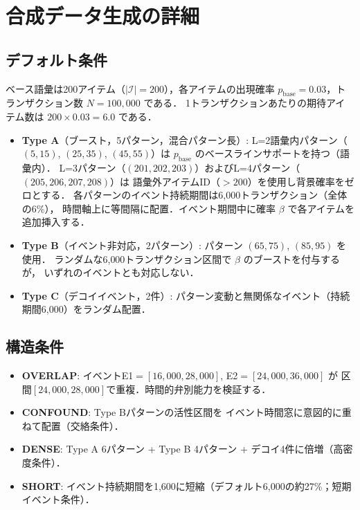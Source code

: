 \section{合成データ生成の詳細}\label{app:synthetic}

\subsection{デフォルト条件}

ベース語彙は200アイテム（$|\mathcal{I}| = 200$），各アイテムの出現確率
$p_{\text{base}} = 0.03$，トランザクション数 $N = 100{,}000$ である．
1トランザクションあたりの期待アイテム数は $200 \times 0.03 = 6.0$ である．

\begin{itemize}
\item \textbf{Type A}（ブースト，5パターン，混合パターン長）:
    L=2語彙内パターン（$(5,15)$, $(25,35)$, $(45,55)$）は
    $p_{\text{base}}$ のベースラインサポートを持つ（語彙内）．
    L=3パターン（$(201,202,203)$）およびL=4パターン（$(205,206,207,208)$）は
    語彙外アイテムID（$>200$）を使用し背景確率をゼロとする．
    各パターンのイベント持続期間は6{,}000トランザクション（全体の6\%），
    時間軸上に等間隔に配置．イベント期間中に確率 $\beta$ で各アイテムを追加挿入する．
\item \textbf{Type B}（イベント非対応，2パターン）:
    パターン $(65,75)$, $(85,95)$ を使用．
    ランダムな6{,}000トランザクション区間で $\beta$ のブーストを付与するが，
    いずれのイベントとも対応しない．
\item \textbf{Type C}（デコイイベント，2件）:
    パターン変動と無関係なイベント（持続期間6{,}000）をランダム配置．
\end{itemize}

\subsection{構造条件}

\begin{itemize}
\item \textbf{OVERLAP}: イベントE1$=[16{,}000,28{,}000]$, E2$=[24{,}000,36{,}000]$ が
    区間$[24{,}000,28{,}000]$で重複．時間的弁別能力を検証する．
\item \textbf{CONFOUND}: Type Bパターンの活性区間を
    イベント時間窓に意図的に重ねて配置（交絡条件）．
\item \textbf{DENSE}: Type A 6パターン + Type B 4パターン +
    デコイ4件に倍増（高密度条件）．
\item \textbf{SHORT}: イベント持続期間を1{,}600に短縮（デフォルト6{,}000の約27\%；短期イベント条件）．
\end{itemize}

